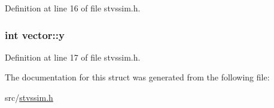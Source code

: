 Definition at line 16 of file stvssim.\-h.

\hypertarget{structvector_aad6de640298eae97ca0a094db5aff477}{
\subsubsection[{y}]{\setlength{\rightskip}{0pt plus 5cm}int vector\-::y}}\label{structvector_aad6de640298eae97ca0a094db5aff477}


Definition at line 17 of file stvssim.\-h.



The documentation for this struct was generated from the following file\-:\begin{DoxyCompactItemize}
\item 
src/\hyperlink{stvssim_8h}{stvssim.\-h}\end{DoxyCompactItemize}
